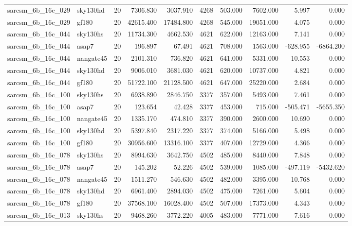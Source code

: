 \begin{tabular}{llrrrrrrrr}
sarcsm\_6b\_16c\_029 & sky130hd & 20 & 7306.830 & 3037.910 & 4268 & 503.000 & 7602.000 & 5.997 & 0.000 \\
sarcsm\_6b\_16c\_029 & gf180 & 20 & 42615.400 & 17484.800 & 4268 & 545.000 & 19051.000 & 4.075 & 0.000 \\
sarcsm\_6b\_16c\_044 & sky130hs & 20 & 11734.300 & 4662.530 & 4621 & 622.000 & 12163.000 & 7.141 & 0.000 \\
sarcsm\_6b\_16c\_044 & asap7 & 20 & 196.897 & 67.491 & 4621 & 708.000 & 1563.000 & -628.955 & -6864.200 \\
sarcsm\_6b\_16c\_044 & nangate45 & 20 & 2101.310 & 736.820 & 4621 & 641.000 & 5331.000 & 10.553 & 0.000 \\
sarcsm\_6b\_16c\_044 & sky130hd & 20 & 9006.010 & 3681.030 & 4621 & 620.000 & 10737.000 & 4.821 & 0.000 \\
sarcsm\_6b\_16c\_044 & gf180 & 20 & 51722.100 & 21128.500 & 4621 & 647.000 & 25220.000 & 2.684 & 0.000 \\
sarcsm\_6b\_16c\_100 & sky130hs & 20 & 6938.890 & 2846.750 & 3377 & 357.000 & 5493.000 & 7.461 & 0.000 \\
sarcsm\_6b\_16c\_100 & asap7 & 20 & 123.654 & 42.428 & 3377 & 453.000 & 715.000 & -505.471 & -5655.350 \\
sarcsm\_6b\_16c\_100 & nangate45 & 20 & 1335.170 & 474.810 & 3377 & 390.000 & 2600.000 & 10.690 & 0.000 \\
sarcsm\_6b\_16c\_100 & sky130hd & 20 & 5397.840 & 2317.220 & 3377 & 374.000 & 5166.000 & 5.498 & 0.000 \\
sarcsm\_6b\_16c\_100 & gf180 & 20 & 30956.600 & 13316.100 & 3377 & 407.000 & 12729.000 & 4.366 & 0.000 \\
sarcsm\_6b\_16c\_078 & sky130hs & 20 & 8994.630 & 3642.750 & 4502 & 485.000 & 8440.000 & 7.848 & 0.000 \\
sarcsm\_6b\_16c\_078 & asap7 & 20 & 145.202 & 52.226 & 4502 & 539.000 & 1085.000 & -497.119 & -5432.620 \\
sarcsm\_6b\_16c\_078 & nangate45 & 20 & 1511.270 & 546.630 & 4502 & 482.000 & 3395.000 & 10.768 & 0.000 \\
sarcsm\_6b\_16c\_078 & sky130hd & 20 & 6961.400 & 2894.030 & 4502 & 475.000 & 7261.000 & 5.604 & 0.000 \\
sarcsm\_6b\_16c\_078 & gf180 & 20 & 37568.100 & 16028.400 & 4502 & 507.000 & 17373.000 & 4.343 & 0.000 \\
sarcsm\_6b\_16c\_013 & sky130hs & 20 & 9468.260 & 3772.220 & 4005 & 483.000 & 7771.000 & 7.616 & 0.000 \\

\end{tabular}
